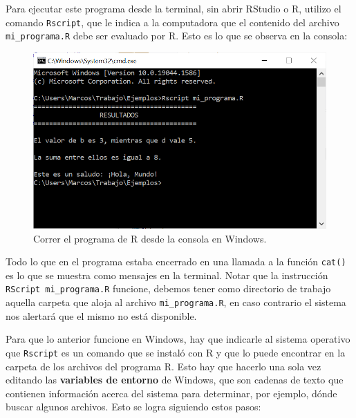 \documentclass[
]{book}
\begin{document}
Para ejecutar este programa desde la terminal, sin abrir RStudio o R, utilizo el comando \texttt{Rscript}, que le indica a la computadora que el contenido del archivo \texttt{mi\_programa.R} debe ser evaluado por R. Esto es lo que se observa en la consola:

\begin{figure}

{\centering \includegraphics[width=0.8\linewidth]{images/07_otros/terminal7} 

}

\caption{Correr el programa de R desde la consola en Windows.}\label{fig:unnamed-chunk-176}
\end{figure}

Todo lo que en el programa estaba encerrado en una llamada a la función \texttt{cat()} es lo que se muestra como mensajes en la terminal. Notar que la instrucción \texttt{RScript\ mi\_programa.R} funcione, debemos tener como directorio de trabajo aquella carpeta que aloja al archivo \texttt{mi\_programa.R}, en caso contrario el sistema nos alertará que el mismo no está disponible.

Para que lo anterior funcione en Windows, hay que indicarle al sistema operativo que \texttt{Rscript} es un comando que se instaló con R y que lo puede encontrar en la carpeta de los archivos del programa R. Esto hay que hacerlo una sola vez editando las \textbf{variables de entorno} de Windows, que son cadenas de texto que contienen información acerca del sistema para determinar, por ejemplo, dónde buscar algunos archivos. Esto se logra siguiendo estos pasos:
\end{document}
